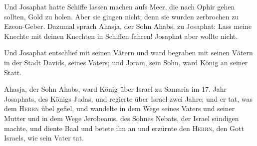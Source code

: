  Und Josaphat hatte Schiffe lassen machen aufs Meer, die
nach Ophir gehen sollten, Gold zu holen. Aber sie gingen nicht; denn sie
wurden zerbrochen zu Ezeon-Geber.  Dazumal sprach Ahasja,
der Sohn Ahabs, zu Josaphat: Lass meine Knechte mit deinen Knechten in
Schiffen fahren! Josaphat aber wollte nicht.

 Und Josaphat entschlief mit seinen Vätern und ward
begraben mit seinen Vätern in der Stadt Davids, seines Vaters; und
Joram, sein Sohn, ward König an seiner Statt.

 Ahasja, der Sohn Ahabs, ward König über Israel zu
Samaria im 17. Jahr Josaphats, des Königs Judas, und regierte über
Israel zwei Jahre;  und er tat, was dem \textsc{Herrn}
übel gefiel, und wandelte in dem Wege seines Vaters und seiner Mutter
und in dem Wege Jerobeams, des Sohnes Nebats, der Israel sündigen
machte,  und diente Baal und betete ihn an und erzürnte
den \textsc{Herrn}, den Gott Israels, wie sein Vater tat.
